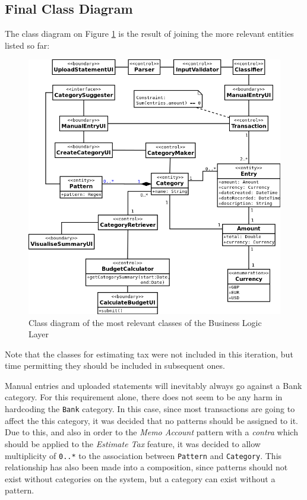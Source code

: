 \subsection{Final Class Diagram}
The class diagram on Figure \ref{fig:ClassDiagram.AllClasses} is the result of
joining the more relevant entities listed so far:
\begin{figure}[ht!]
  \begin{center}
    \includegraphics[width=15cm]{./contents/img/Class_Diagram_-_All_Classes.png}
  \end{center}
  \caption{Class diagram of the most relevant classes of the Business Logic Layer}
  \label{fig:ClassDiagram.AllClasses}
\end{figure}

Note that the classes for estimating tax were not included in this iteration,
but time permitting they should be included in subsequent ones.

Manual entries and uploaded statements will inevitably always go against a Bank
category. For this requirement alone, there does not seem to be any harm in
hardcoding the \texttt{Bank} category. In this case, since most transactions
are going to affect the this category, it was decided that no patterns should
be assigned to it. Due to this, and also in order to the \emph{Memo Account}
pattern with a \emph{contra} which should be applied to the \emph{Estimate Tax}
feature, it was decided to allow multiplicity of \texttt{0..*} to the
association between \texttt{Pattern} and \texttt{Category}. This relationship
has also been made into a composition, since patterns should not exist without
categories on the system, but a category can exist without a pattern.
